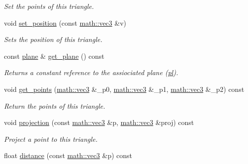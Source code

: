 \begin{DoxyCompactItemize}
\begin{DoxyCompactList}\small\item\em Set the points of this triangle. \end{DoxyCompactList}\item 
void \hyperlink{classphysim_1_1geometry_1_1triangle_a9446670dcea26f020c4ad10c7234cce6}{set\+\_\+position} (const \hyperlink{structphysim_1_1math_1_1vec3}{math\+::vec3} \&v)
\begin{DoxyCompactList}\small\item\em Sets the position of this triangle. \end{DoxyCompactList}\item 
\mbox{\label{classphysim_1_1geometry_1_1triangle_a5451577cd5511fb6bc6874795e307042}} 
const \hyperlink{classphysim_1_1geometry_1_1plane}{plane} \& \hyperlink{classphysim_1_1geometry_1_1triangle_a5451577cd5511fb6bc6874795e307042}{get\+\_\+plane} () const
\begin{DoxyCompactList}\small\item\em Returns a constant reference to the assiociated plane (\hyperlink{classphysim_1_1geometry_1_1triangle_a4fcfc136bcc0d2cdf31c37a7a71fc9f8}{pl}). \end{DoxyCompactList}\item 
void \hyperlink{classphysim_1_1geometry_1_1triangle_a6d78d93d66524dacd0270c3d6c293319}{get\+\_\+points} (\hyperlink{structphysim_1_1math_1_1vec3}{math\+::vec3} \&\+\_\+p0, \hyperlink{structphysim_1_1math_1_1vec3}{math\+::vec3} \&\+\_\+p1, \hyperlink{structphysim_1_1math_1_1vec3}{math\+::vec3} \&\+\_\+p2) const
\begin{DoxyCompactList}\small\item\em Return the points of this triangle. \end{DoxyCompactList}\item 
void \hyperlink{classphysim_1_1geometry_1_1triangle_a302e6c6d964849980d1caa60736cae1d}{projection} (const \hyperlink{structphysim_1_1math_1_1vec3}{math\+::vec3} \&p, \hyperlink{structphysim_1_1math_1_1vec3}{math\+::vec3} \&proj) const
\begin{DoxyCompactList}\small\item\em Project a point to this triangle. \end{DoxyCompactList}\item 
float \hyperlink{classphysim_1_1geometry_1_1triangle_a0a2c713287510cf43a00ca3139af27b8}{distance} (const \hyperlink{structphysim_1_1math_1_1vec3}{math\+::vec3} \&p) const

\end{DoxyCompactItemize}
